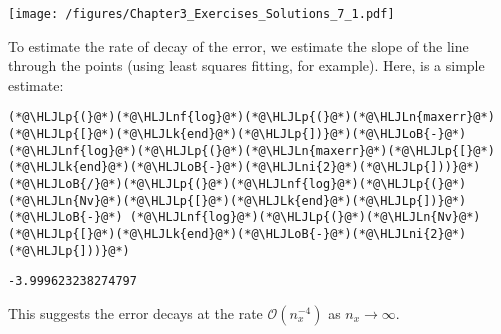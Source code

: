 \documentclass[12pt,a4paper]{article}
\newcommand{\HLJLk}[1]{\textcolor[RGB]{148,91,176}{\textbf{#1}}}
\newcommand{\HLJLn}[1]{#1}
\newcommand{\HLJLnf}[1]{\textcolor[RGB]{66,102,213}{#1}}
\newcommand{\HLJLni}[1]{\textcolor[RGB]{59,151,46}{#1}}
\newcommand{\HLJLoB}[1]{\textcolor[RGB]{102,102,102}{\textbf{#1}}}
\newcommand{\HLJLp}[1]{#1}
\begin{document}
\texttt{[image: /figures/Chapter3\_Exercises\_Solutions\_7\_1.pdf]}

To estimate the rate of decay of the error, we estimate the slope of the line through the points (using least squares fitting, for example). Here, is a simple estimate: 


\begin{lstlisting}
(*@\HLJLp{(}@*)(*@\HLJLnf{log}@*)(*@\HLJLp{(}@*)(*@\HLJLn{maxerr}@*)(*@\HLJLp{[}@*)(*@\HLJLk{end}@*)(*@\HLJLp{])}@*)(*@\HLJLoB{-}@*)(*@\HLJLnf{log}@*)(*@\HLJLp{(}@*)(*@\HLJLn{maxerr}@*)(*@\HLJLp{[}@*)(*@\HLJLk{end}@*)(*@\HLJLoB{-}@*)(*@\HLJLni{2}@*)(*@\HLJLp{]))}@*)(*@\HLJLoB{/}@*)(*@\HLJLp{(}@*)(*@\HLJLnf{log}@*)(*@\HLJLp{(}@*)(*@\HLJLn{Nv}@*)(*@\HLJLp{[}@*)(*@\HLJLk{end}@*)(*@\HLJLp{])}@*) (*@\HLJLoB{-}@*) (*@\HLJLnf{log}@*)(*@\HLJLp{(}@*)(*@\HLJLn{Nv}@*)(*@\HLJLp{[}@*)(*@\HLJLk{end}@*)(*@\HLJLoB{-}@*)(*@\HLJLni{2}@*)(*@\HLJLp{]))}@*)
\end{lstlisting}

\begin{lstlisting}
-3.999623238274797
\end{lstlisting}


This suggests the error decays at the rate $\mathcal{O}(n_x^{-4})$ as $n_x \to \infty$.
\end{document}
